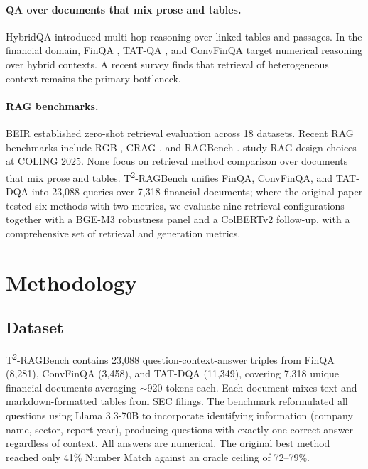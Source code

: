 \documentclass{article}
\begin{document}
\paragraph{QA over documents that mix prose and tables.}
HybridQA \citep{chen2020hybridqa} introduced multi-hop reasoning over linked tables and passages. In the financial domain, FinQA \citep{chen2021finqa}, TAT-QA \citep{zhu2021tatqa}, and ConvFinQA \citep{chen2022convfinqa} target numerical reasoning over hybrid contexts. A recent survey \citep{nan2025tableqasurvey} finds that retrieval of heterogeneous context remains the primary bottleneck.

\paragraph{RAG benchmarks.}
BEIR \citep{thakur2021beir} established zero-shot retrieval evaluation across 18 datasets. Recent RAG benchmarks include RGB \citep{chen2024rgb}, CRAG \citep{yang2024crag}, and RAGBench \citep{friel2024ragbench}. \citet{li2025ragbestpractices} study RAG design choices at COLING 2025. None focus on retrieval method comparison over documents that mix prose and tables. T\textsuperscript{2}-RAGBench \citep{strich2026t2ragbench} unifies FinQA, ConvFinQA, and TAT-DQA into 23,088 queries over 7,318 financial documents; where the original paper tested six methods with two metrics, we evaluate nine retrieval configurations together with a BGE-M3 robustness panel and a ColBERTv2 follow-up, with a comprehensive set of retrieval and generation metrics.

\section{Methodology}
\label{sec:method}

\subsection{Dataset}
\label{sec:dataset}

T\textsuperscript{2}-RAGBench \citep{strich2026t2ragbench} contains 23,088 question-context-answer triples from FinQA (8,281), ConvFinQA (3,458), and TAT-DQA (11,349), covering 7,318 unique financial documents averaging $\sim$920 tokens each. Each document mixes text and markdown-formatted tables from SEC filings. The benchmark reformulated all questions using Llama 3.3-70B to incorporate identifying information (company name, sector, report year), producing questions with exactly one correct answer regardless of context. All answers are numerical. The original best method reached only 41\% Number Match against an oracle ceiling of 72--79\%.
\end{document}
